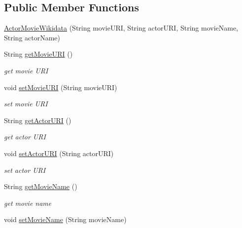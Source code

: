 \subsection*{Public Member Functions}
\begin{DoxyCompactItemize}
\item 
\hyperlink{classbridges_1_1data__src__dependent_1_1_actor_movie_wikidata_a0204efcc0ee869cf059228b99965a9ad}{Actor\+Movie\+Wikidata} (String movie\+U\+RI, String actor\+U\+RI, String movie\+Name, String actor\+Name)
\item 
String \hyperlink{classbridges_1_1data__src__dependent_1_1_actor_movie_wikidata_a36b856c85ef3e634c6f6cb79402c1469}{get\+Movie\+U\+RI} ()
\begin{DoxyCompactList}\small\item\em get movie U\+RI \end{DoxyCompactList}\item 
void \hyperlink{classbridges_1_1data__src__dependent_1_1_actor_movie_wikidata_a83b6e202e9ff88aa0d5afbc467edabc7}{set\+Movie\+U\+RI} (String movie\+U\+RI)
\begin{DoxyCompactList}\small\item\em set movie U\+RI \end{DoxyCompactList}\item 
String \hyperlink{classbridges_1_1data__src__dependent_1_1_actor_movie_wikidata_a39fb69868ed39bb9c43cf512300e47a3}{get\+Actor\+U\+RI} ()
\begin{DoxyCompactList}\small\item\em get actor U\+RI \end{DoxyCompactList}\item 
void \hyperlink{classbridges_1_1data__src__dependent_1_1_actor_movie_wikidata_a48281ef156f333742f0377820e35d461}{set\+Actor\+U\+RI} (String actor\+U\+RI)
\begin{DoxyCompactList}\small\item\em set actor U\+RI \end{DoxyCompactList}\item 
String \hyperlink{classbridges_1_1data__src__dependent_1_1_actor_movie_wikidata_a8c10a2fbd4db1223dfb6c115457bbfa0}{get\+Movie\+Name} ()
\begin{DoxyCompactList}\small\item\em get movie name \end{DoxyCompactList}\item 
void \hyperlink{classbridges_1_1data__src__dependent_1_1_actor_movie_wikidata_ab327cb180c9912357318efa02ee1ea40}{set\+Movie\+Name} (String movie\+Name)

\end{DoxyCompactItemize}
